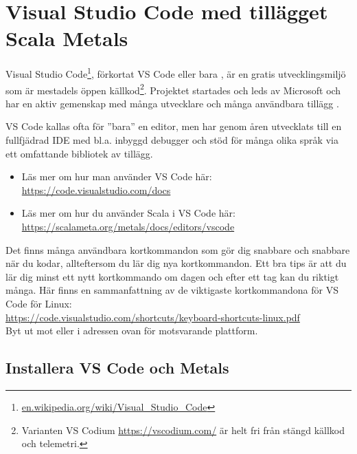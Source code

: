 
\section{Visual Studio Code med tillägget Scala Metals}\label{appendix:ide:vscode}

Visual Studio Code\footnote{\href{https://en.wikipedia.org/wiki/Visual\_Studio\_Code}{en.wikipedia.org/wiki/Visual\_Studio\_Code}}, förkortat VS Code eller bara , är en gratis utvecklingsmiljö som är mestadels öppen källkod\footnote{Varianten VS Codium \url{https://vscodium.com/} är helt fri från stängd källkod och telemetri.}. Projektet startades och leds av Microsoft och har en aktiv gemenskap med många utvecklare och många användbara tillägg .

VS Code kallas ofta för ''bara'' en editor, men har genom åren utvecklats till en fullfjädrad IDE med bl.a. inbyggd debugger och stöd för många olika språk via ett omfattande bibliotek av tillägg.%

\begin{itemize}
\item 
Läs mer om hur man använder VS Code här: \\
\url{https://code.visualstudio.com/docs}

\item
Läs mer om hur du använder Scala i VS Code här: \\
\url{https://scalameta.org/metals/docs/editors/vscode}

\end{itemize}

Det finns många användbara kortkommandon som gör dig snabbare och snabbare när du kodar, allteftersom du lär dig nya kortkommandon. Ett bra tips är att du lär dig minst ett nytt kortkommando om dagen och efter ett tag kan du riktigt många. Här finns en sammanfattning av de viktigaste kortkommandona för VS Code för Linux:\\
\url{https://code.visualstudio.com/shortcuts/keyboard-shortcuts-linux.pdf}\\
Byt ut  mot  eller  i adressen ovan för motsvarande plattform.

\subsection{Installera VS Code och Metals}\label{appendix:ide:vscode:install}

